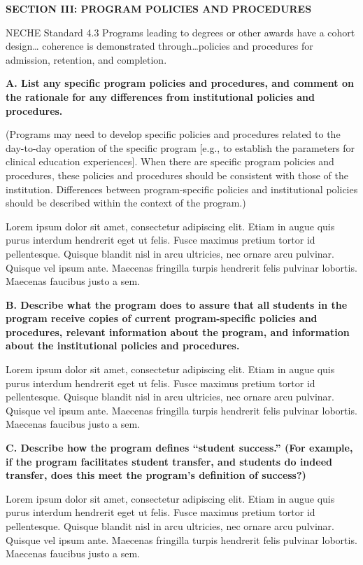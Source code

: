 \textbf{SECTION III: PROGRAM POLICIES AND PROCEDURES}

NECHE Standard 4.3 Programs leading to degrees or other awards have a cohort design… coherence is demonstrated through…policies and procedures for admission, retention, and completion.



\textbf{A. List any specific program policies and procedures, and comment on the rationale for any differences from institutional policies and procedures.}

(Programs may need to develop specific policies and procedures related to the day-to-day operation of the specific program [e.g., to establish the parameters for clinical education experiences]. When there are specific program policies and procedures, these policies and procedures should be consistent with those of the institution. Differences between program-specific policies and institutional policies should be described within the context of the program.)





Lorem ipsum dolor sit amet, consectetur adipiscing elit. Etiam in augue quis purus interdum hendrerit eget ut felis. Fusce maximus pretium tortor id pellentesque. Quisque blandit nisl in arcu ultricies, nec ornare arcu pulvinar. Quisque vel ipsum ante. Maecenas fringilla turpis hendrerit felis pulvinar lobortis. Maecenas faucibus justo a sem. 


\textbf{B. Describe what the program does to assure that all students in the program receive copies of current program-specific policies and procedures, relevant information about the program, and information about the institutional policies and procedures.}






Lorem ipsum dolor sit amet, consectetur adipiscing elit. Etiam in augue quis purus interdum hendrerit eget ut felis. Fusce maximus pretium tortor id pellentesque. Quisque blandit nisl in arcu ultricies, nec ornare arcu pulvinar. Quisque vel ipsum ante. Maecenas fringilla turpis hendrerit felis pulvinar lobortis. Maecenas faucibus justo a sem. 



\textbf{C. Describe how the program defines “student success.” (For example, if the program facilitates student transfer, and students do indeed transfer, does this meet the program’s definition of success?)} 


Lorem ipsum dolor sit amet, consectetur adipiscing elit. Etiam in augue quis purus interdum hendrerit eget ut felis. Fusce maximus pretium tortor id pellentesque. Quisque blandit nisl in arcu ultricies, nec ornare arcu pulvinar. Quisque vel ipsum ante. Maecenas fringilla turpis hendrerit felis pulvinar lobortis. Maecenas faucibus justo a sem. 
